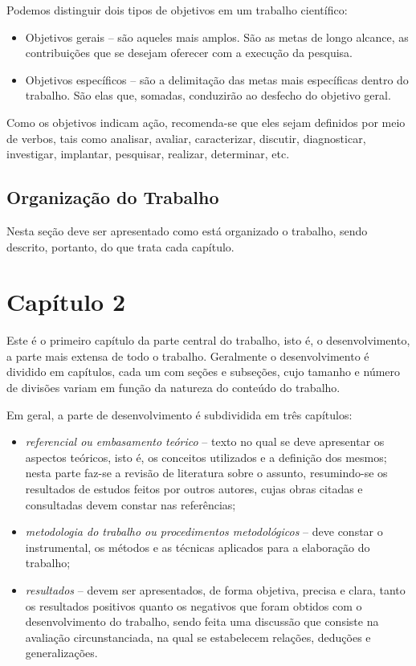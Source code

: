 \documentclass[
	12pt,			%
	openright,		%
	oneside,	
	a4paper,		%
	english,		%
	brazil			%
]{abntex2/abntex2}  %
\begin{document}
		Podemos distinguir dois tipos de objetivos em um trabalho científico:
		
		\begin{itemize}
			\item Objetivos gerais – são aqueles mais amplos. São as metas de longo alcance, as contribuições que se desejam oferecer com a execução da pesquisa.

			\item Objetivos específicos – são a delimitação das metas mais específicas dentro do trabalho. São elas que, somadas, conduzirão ao desfecho do objetivo geral.
		\end{itemize}
		
		Como os objetivos indicam ação, recomenda-se que eles sejam definidos por meio de verbos, tais como analisar, avaliar, caracterizar, discutir, diagnosticar, investigar, implantar, pesquisar, realizar, determinar, etc.
		
	\section{Organização do Trabalho}
	
		Nesta seção deve ser apresentado como está organizado o trabalho, sendo descrito, portanto, do que trata cada capítulo.


\chapter{Capítulo 2}

	Este é o primeiro capítulo da parte central do trabalho, isto é, o
desenvolvimento, a parte mais extensa de todo o trabalho. Geralmente o
desenvolvimento é dividido em capítulos, cada um com seções e subseções,
cujo tamanho e número de divisões variam em função da natureza do
conteúdo do trabalho.

	Em geral, a parte de desenvolvimento é subdividida em três capítulos:

	\begin{itemize}
		\item \textit{referencial ou embasamento teórico} – texto no qual se deve apresentar os aspectos teóricos, isto é, os conceitos utilizados e a definição dos mesmos; nesta parte faz-se a revisão de literatura sobre o assunto, resumindo-se os resultados de estudos feitos por outros autores, cujas obras citadas e consultadas devem constar nas referências;
	
		\item \textit{metodologia do trabalho ou procedimentos metodológicos} – deve constar o instrumental, os métodos e as técnicas aplicados para a elaboração do trabalho;
	
		\item \textit{resultados} – devem ser apresentados, de forma objetiva, precisa e clara, tanto os resultados positivos quanto os negativos que foram obtidos com o desenvolvimento do trabalho, sendo feita uma discussão que consiste na avaliação circunstanciada, na qual se estabelecem relações, deduções e generalizações.
	\end{itemize}
\end{document}
